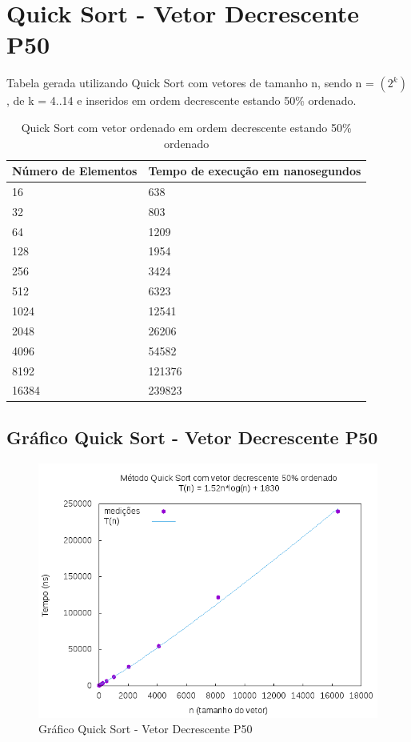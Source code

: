 \documentclass[12pt,a4paper,twoside]{report}
\begin{document}
\section{Quick Sort - Vetor Decrescente P50}
Tabela gerada utilizando Quick Sort com vetores de tamanho n, sendo n = $(2^k)$, de k = 4..14 e inseridos em ordem decrescente estando 50\% ordenado.
\begin{table}[H]
\centering
\caption{Quick Sort com vetor ordenado em ordem decrescente estando 50\% ordenado}
\label{my-label}
\begin{tabular}{|l|l|}
\hline
\multicolumn{1}{|c|}{\textbf{Número de Elementos}} & \multicolumn{1}{c|}{\textbf{Tempo de execução em nanosegundos}} \\ \hline
16 & 638 \\ \hline
32 & 803 \\ \hline
64 & 1209 \\ \hline
128 & 1954 \\ \hline
256 & 3424 \\ \hline
512 & 6323 \\ \hline
1024 & 12541 \\ \hline
2048 & 26206 \\ \hline
4096 & 54582 \\ \hline
8192 & 121376 \\ \hline
16384 & 239823 \\ \hline
\end{tabular}
\end{table}

\subsection{Gráfico Quick Sort - Vetor Decrescente P50}
\begin{figure}[H]
    \centering
    \includegraphics[width=0.7\linewidth]{graficos/QuickSort/vIntDecrescenteP50/vIntDecrescenteP50.png}
  \caption{Gráfico Quick Sort - Vetor Decrescente P50}
\end{figure}
\end{document}
